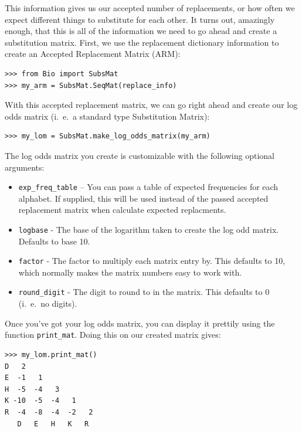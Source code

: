 \documentclass{report}
\begin{document}
This information gives us our accepted number of replacements, or how
often we expect different things to substitute for each other. It
turns out, amazingly enough, that this is all of the information we
need to go ahead and create a substitution matrix. First, we use the
replacement dictionary information to create an Accepted Replacement
Matrix (ARM):

\begin{verbatim}
>>> from Bio import SubsMat
>>> my_arm = SubsMat.SeqMat(replace_info)
\end{verbatim}

With this accepted replacement matrix, we can go right ahead and
create our log odds matrix (i.~e.~a standard type Substitution Matrix):

\begin{verbatim}
>>> my_lom = SubsMat.make_log_odds_matrix(my_arm)
\end{verbatim}

The log odds matrix you create is customizable with the following
optional arguments:

\begin{itemize}
  \item \verb|exp_freq_table| -- You can pass a table of expected
  frequencies for each alphabet. If supplied, this will be used
  instead of the passed accepted replacement matrix when calculate
  expected replacments.

  \item \verb|logbase| - The base of the logarithm taken to create the
  log odd matrix. Defaults to base 10.

  \item \verb|factor| - The factor to multiply each matrix entry
  by. This defaults to 10, which normally makes the matrix numbers
  easy to work with.

  \item \verb|round_digit| - The digit to round to in the matrix. This
  defaults to 0 (i.~e.~no digits).

\end{itemize}

Once you've got your log odds matrix, you can display it prettily
using the function \verb|print_mat|. Doing this on our created matrix
gives:

\begin{verbatim}
>>> my_lom.print_mat()
D   2
E  -1   1
H  -5  -4   3
K -10  -5  -4   1
R  -4  -8  -4  -2   2
   D   E   H   K   R
\end{verbatim}
\end{document}
